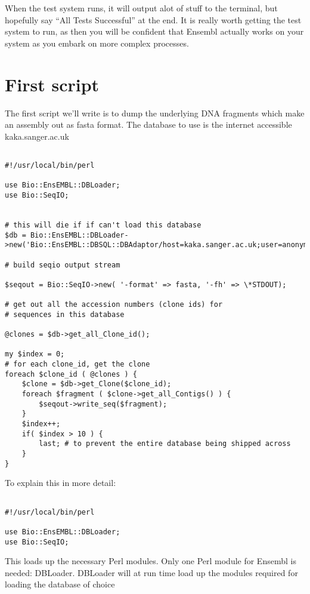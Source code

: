 \documentclass[11pt,a4paper]{article}
\begin{document}
When the test system runs, it will output alot of stuff to the terminal, but hopefully say
``All Tests Successful'' at the end. It is really worth getting the test system to run, as then you
will be confident that Ensembl actually works on your system as you embark on more complex processes.

\section{First script}

The first script we'll write is to dump the underlying DNA fragments
which make an assembly out as fasta format. The database to use is
the internet accessible kaka.sanger.ac.uk 

\begin{verbatim}

#!/usr/local/bin/perl

use Bio::EnsEMBL::DBLoader;
use Bio::SeqIO;


# this will die if if can't load this database
$db = Bio::EnsEMBL::DBLoader->new('Bio::EnsEMBL::DBSQL::DBAdaptor/host=kaka.sanger.ac.uk;user=anonymous;dbname=current');

# build seqio output stream

$seqout = Bio::SeqIO->new( '-format' => fasta, '-fh' => \*STDOUT);

# get out all the accession numbers (clone ids) for
# sequences in this database

@clones = $db->get_all_Clone_id();

my $index = 0;
# for each clone_id, get the clone
foreach $clone_id ( @clones ) {
	$clone = $db->get_Clone($clone_id);
	foreach $fragment ( $clone->get_all_Contigs() ) {
		$seqout->write_seq($fragment);
   	}
	$index++;
	if( $index > 10 ) {
		last; # to prevent the entire database being shipped across
	}
}

\end{verbatim}

To explain this in more detail:

\begin{verbatim}

#!/usr/local/bin/perl

use Bio::EnsEMBL::DBLoader;
use Bio::SeqIO;

\end{verbatim}

This loads up the necessary Perl modules. Only one Perl module for Ensembl is needed: DBLoader.
DBLoader will at run time load up the modules required for loading the database of choice
\end{document}
